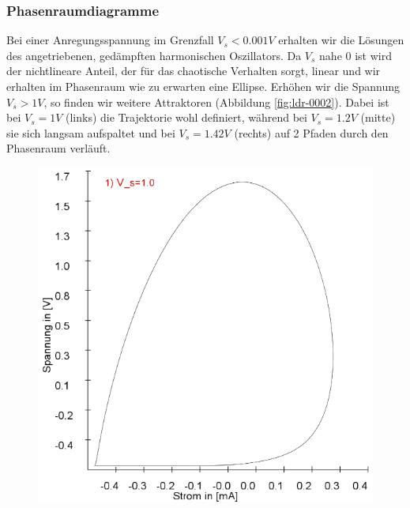 \documentclass{scrartcl}
\begin{document}
\subsubsection{Phasenraumdiagramme}
Bei einer Anregungsspannung im Grenzfall $V_s < 0.001V$ erhalten wir die Lösungen des angetriebenen, gedämpften harmonischen Oszillators. Da $V_s$ nahe 0 ist wird der nichtlineare Anteil, der für das chaotische Verhalten sorgt, linear und wir erhalten im Phasenraum wie zu erwarten eine Ellipse. 
Erhöhen wir die Spannung $V_s>1V$, so finden wir weitere Attraktoren (Abbildung \ref{fig:ldr-0002}). Dabei ist bei $V_s=1V$ (links) die Trajektorie wohl definiert, während bei $V_s=1.2V$ (mitte) sie sich langsam aufspaltet und bei $V_s=1.42V$ (rechts) auf 2 Pfaden durch den Phasenraum verläuft.
\begin{figure}[!htbp]
\includegraphics[scale=0.28]{schwing-runge-nach300k-weitere20k-10-9-1V}

\end{figure}
\end{document}
